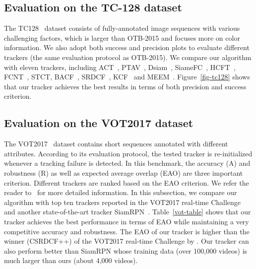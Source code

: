\documentclass[10pt,twocolumn,letterpaper]{article}
\begin{document}
\subsection{Evaluation on the TC-128 dataset}
The TC128~\cite{TC128} dataset consists of  fully-annotated image sequences
with  various challenging factors, which is larger than OTB-2015 and focuses
more on color information. We also adopt both success and precision plots to evaluate
different trackers (the same evaluation protocol as OTB-2015). We compare our algorithm
with eleven trackers, including ACT~\cite{chen-ECCV18-act}, PTAV~\cite{ptav-iccv17},
Dsiam~\cite{Guo-dsiam-iccv2017},
SiameFC~\cite{Bertinetto-ECCV16-SiamesFC}, HCFT~\cite{Ma-ICCV15-HCFT},
FCNT~\cite{Wang-ICCV15-FCNT}, STCT\cite{Wang-CVPR16-STCT},
BACF~\cite{Galoogahi-iccv17-bacf}, SRDCF~\cite{Danelljan-ICCV15-SRDCF},
KCF~\cite{Henriques-TPAMI15-KCF} and MEEM~\cite{Zhang-ECCV14-MEEM}.
Figure~\ref{fig-tc128} shows that our tracker achieves the best results in terms of both precision and success criterion.



\subsection{Evaluation on the VOT2017 dataset}
The VOT2017~\cite{KristanLMFPCVHL-ICCVW17-VOT17} dataset contains
 short sequences annotated with  different attributes.
According to its evaluation protocol, the tested tracker is re-initialized whenever
a tracking failure
is detected. In this benchmark, the accuracy (A) and robustness
(R) as well as expected average overlap (EAO) are three important criterion.
Different trackers are ranked based on the EAO criterion.
We refer the reader to~\cite{KristanLMFPCVHL-ICCVW17-VOT17} for more
detailed information.
In this subsection, we compare our algorithm with top ten trackers reported
in the VOT2017 real-time Challenge~\cite{KristanLMFPCVHL-ICCVW17-VOT17} and another state-of-the-art tracker SiamRPN~\cite{Li-2018CVPR-siameserpn}.
Table~\ref{vot-table} shows that our tracker achieves the best performance in terms of
EAO while maintaining a very competitive accuracy and robustness.
The EAO of our tracker is higher than the winner (CSRDCF++) of the VOT2017 real-time Challenge by .
Our tracker can also perform better than SiamRPN whose training data (over 100,000 videos) is much larger than ours (about 4,000 videos).
	
	
\end{document}
